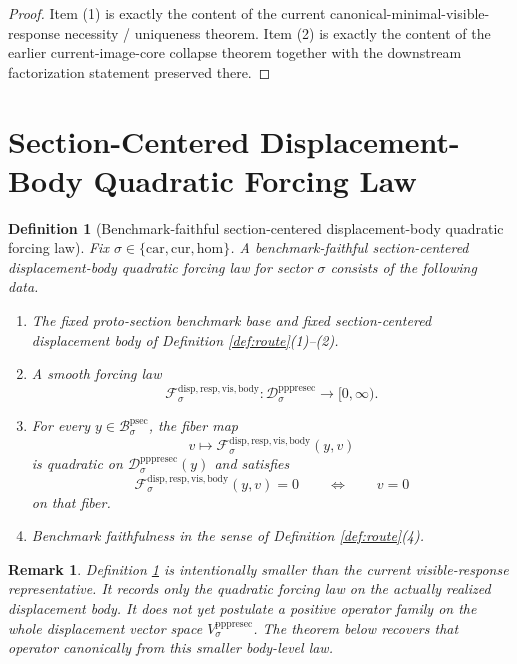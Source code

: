 \documentclass[11pt]{article}
\newcommand{\Car}{\mathrm{car}}
\newcommand{\Cur}{\mathrm{cur}}
\newcommand{\Hom}{\mathrm{hom}}
\newcommand{\ProtoSectionBody}[1]{\mathcal B_{#1}^{\mathrm{psec}}}
\newcommand{\PrePreProtoSectionVertical}[1]{V_{#1}^{\mathrm{pppresec}}}
\newcommand{\PrePreProtoSectionResidualBody}[1]{\mathcal D_{#1}^{\mathrm{pppresec}}}
\newcommand{\VisibleBodyForcingLaw}[1]{\mathscr F_{#1}^{\mathrm{disp,resp,vis,body}}}
\newtheorem{definition}{Definition}
\newtheorem{remark}{Remark}
\begin{document}
\begin{proof}
Item (1) is exactly the content of the current canonical-minimal-visible-response necessity / uniqueness theorem. Item (2) is exactly the content of the earlier current-image-core collapse theorem together with the downstream factorization statement preserved there.
\end{proof}

\section{Section-Centered Displacement-Body Quadratic Forcing Law}

\begin{definition}[Benchmark-faithful section-centered displacement-body quadratic forcing law]
\label{def:law}
Fix \(\sigma\in\{\Car,\Cur,\Hom\}\). A \emph{benchmark-faithful section-centered displacement-body quadratic forcing law} for sector \(\sigma\) consists of the following data.
\begin{enumerate}
    \item The fixed proto-section benchmark base and fixed section-centered displacement body of Definition \ref{def:route}(1)--(2).
    \item A smooth forcing law
    \[
    \VisibleBodyForcingLaw{\sigma}:
    \PrePreProtoSectionResidualBody{\sigma}\to[0,\infty).
    \]
    \item For every \(y\in\ProtoSectionBody{\sigma}\), the fiber map
    \[
    v\mapsto \VisibleBodyForcingLaw{\sigma}(y,v)
    \]
    is quadratic on \(\PrePreProtoSectionResidualBody{\sigma}(y)\) and satisfies
    \[
    \VisibleBodyForcingLaw{\sigma}(y,v)=0
    \qquad\Longleftrightarrow\qquad
    v=0
    \]
    on that fiber.
    \item Benchmark faithfulness in the sense of Definition \ref{def:route}(4).
\end{enumerate}
\end{definition}

\begin{remark}
Definition \ref{def:law} is intentionally smaller than the current visible-response representative. It records only the quadratic forcing law on the actually realized displacement body. It does \emph{not} yet postulate a positive operator family on the whole displacement vector space \(\PrePreProtoSectionVertical{\sigma}\). The theorem below recovers that operator canonically from this smaller body-level law.
\end{remark}
\end{document}
